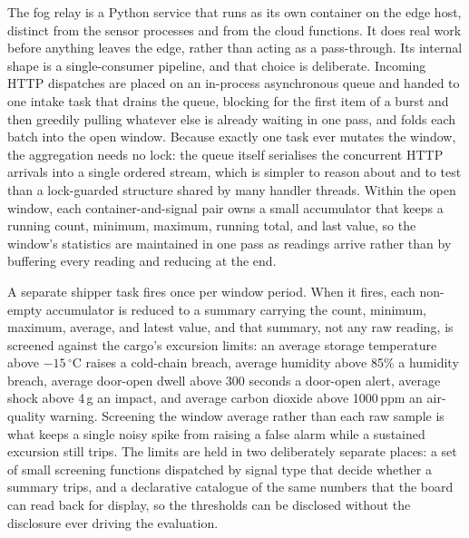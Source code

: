 \documentclass[conference]{IEEEtran}
\begin{document}
The fog relay is a Python service that runs as its own container on the edge host, distinct from the sensor processes and from the cloud functions. It does real work before anything leaves the edge, rather than acting as a pass-through. Its internal shape is a single-consumer pipeline, and that choice is deliberate. Incoming HTTP dispatches are placed on an in-process asynchronous queue and handed to one intake task that drains the queue, blocking for the first item of a burst and then greedily pulling whatever else is already waiting in one pass, and folds each batch into the open window. Because exactly one task ever mutates the window, the aggregation needs no lock: the queue itself serialises the concurrent HTTP arrivals into a single ordered stream, which is simpler to reason about and to test than a lock-guarded structure shared by many handler threads. Within the open window, each container-and-signal pair owns a small accumulator that keeps a running count, minimum, maximum, running total, and last value, so the window's statistics are maintained in one pass as readings arrive rather than by buffering every reading and reducing at the end.

A separate shipper task fires once per window period. When it fires, each non-empty accumulator is reduced to a summary carrying the count, minimum, maximum, average, and latest value, and that summary, not any raw reading, is screened against the cargo's excursion limits: an average storage temperature above $-15\,^{\circ}$C raises a cold-chain breach, average humidity above 85\% a humidity breach, average door-open dwell above 300 seconds a door-open alert, average shock above 4\,g an impact, and average carbon dioxide above 1000\,ppm an air-quality warning. Screening the window average rather than each raw sample is what keeps a single noisy spike from raising a false alarm while a sustained excursion still trips. The limits are held in two deliberately separate places: a set of small screening functions dispatched by signal type that decide whether a summary trips, and a declarative catalogue of the same numbers that the board can read back for display, so the thresholds can be disclosed without the disclosure ever driving the evaluation.
\end{document}
